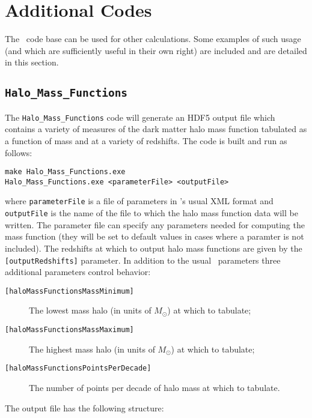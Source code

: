 \section{Additional Codes}

The \glc\ code base can be used for other calculations. Some examples of such usage (and which are sufficiently useful in their own right) are included and are detailed in this section.

\subsection{{\tt Halo\_Mass\_Functions}}

The {\tt Halo\_Mass\_Functions} code will generate an HDF5 output file which contains a variety of measures of the dark matter halo mass function tabulated as a function of mass and at a variety of redshifts. The code is built and run as follows:
\begin{verbatim}
make Halo_Mass_Functions.exe
Halo_Mass_Functions.exe <parameterFile> <outputFile>
\end{verbatim}
where {\tt parameterFile} is a file of parameters in \glc's usual XML format and {\tt outputFile} is the name of the file to which the halo mass function data will be written. The parameter file can specify any parameters needed for computing the mass function (they will be set to default values in cases where a paramter is not included). The redshifts at which to output halo mass functions are given by the {\tt [outputRedshifts]} parameter. In addition to the usual \glc\ parameters three additional parameters control behavior:
\begin{description}
\item [{\tt [haloMassFunctionsMassMinimum]}] The lowest mass halo (in units of $M_\odot$) at which to tabulate;
\item [{\tt [haloMassFunctionsMassMaximum]}] The highest mass halo (in units of $M_\odot$) at which to tabulate;
\item [{\tt [haloMassFunctionsPointsPerDecade]}] The number of points per decade of halo mass at which to tabulate.
\end{description}
The output file has the following structure:
